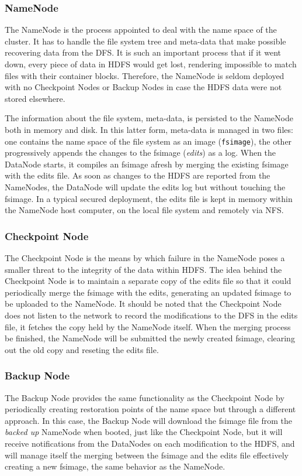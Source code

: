 \subsubsection{NameNode}\label{subsubsec:namenode}
\noindent The NameNode is the process appointed to deal with the name space of the cluster. It has to handle the file system tree and meta-data that make possible recovering data from the DFS. It is such an important process that if it went down, every piece of data in HDFS would get lost, rendering impossible to match files with their container blocks. Therefore, the NameNode is seldom deployed with no Checkpoint Nodes or Backup Nodes in case the HDFS data were not stored elsewhere.

The information about the file system, meta-data, is persisted to the NameNode both in memory and disk. In this latter form, meta-data is managed in two files: one contains the name space of the file system as an image (\texttt{fsimage}), the other progressively appends the changes to the fsimage (\emph{edits}) as a log. When the DataNode starts, it compiles an fsimage afresh by merging the existing fsimage with the edits file. As soon as changes to the HDFS are reported from the NameNodes, the DataNode will update the edits log but without touching the fsimage. In a typical secured deployment, the edits file is kept in memory within the NameNode host computer, on the local file system and remotely via NFS.

\subsubsection{Checkpoint Node}\label{subsubsec:checkpointnode}
\noindent The Checkpoint Node is the means by which failure in the NameNode poses a smaller threat to the integrity of the data within HDFS. The idea behind the Checkpoint Node is to maintain a separate copy of the edits file so that it could periodically merge the fsimage with the edits, generating an updated fsimage to be uploaded to the NameNode. It should be noted that the Checkpoint Node does not listen to the network to record the modifications to the DFS in the edits file, it fetches the copy held by the NameNode itself. When the merging process be finished, the NameNode will be submitted the newly created fsimage, clearing out the old copy and reseting the edits file.

\subsubsection{Backup Node}\label{subsubsec:backupnode}
\noindent The Backup Node provides the same functionality as the Checkpoint Node by periodically creating restoration points of the name space but through a different approach. In this case, the Backup Node will download the fsimage file from the \emph{backed up} NameNode when booted, just like the Checkpoint Node, but it will receive notifications from the DataNodes on each modification to the HDFS, and will manage itself the merging between the fsimage and the edits file effectively creating a new fsimage, the same behavior as the NameNode.

